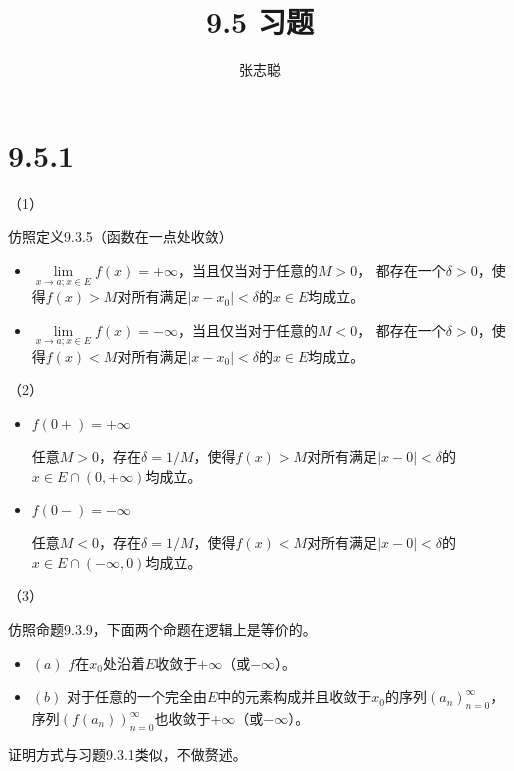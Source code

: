\documentclass{article}
\begin{document}
\title{9.5 习题}
\author{张志聪}
\maketitle

\section*{9.5.1}
（1）

仿照定义9.3.5（函数在一点处收敛）

\begin{itemize}
  \item  $\lim\limits_{x \to a; x \in E}f(x) = +\infty$，当且仅当对于任意的$M > 0$，
        都存在一个$\delta > 0$，使得$f(x) > M$对所有满足$|x - x_0| < \delta$的$x \in E$均成立。

  \item $\lim\limits_{x \to a; x \in E}f(x) = -\infty$，当且仅当对于任意的$M < 0$，
        都存在一个$\delta > 0$，使得$f(x) < M$对所有满足$|x - x_0| < \delta$的$x \in E$均成立。

\end{itemize}

（2）

\begin{itemize}
  \item $f(0+) = +\infty$

        任意$M > 0$，存在$\delta = 1/M$，使得$f(x) > M$对所有满足$|x - 0| < \delta$的$x \in E \cap (0, +\infty)$均成立。

  \item $f(0-) = -\infty$

        任意$M < 0$，存在$\delta = 1/M$，使得$f(x) < M$对所有满足$|x - 0| < \delta$的$x \in E \cap (-\infty, 0)$均成立。
\end{itemize}


（3）

仿照命题9.3.9，下面两个命题在逻辑上是等价的。

\begin{itemize}
  \item $(a)$ $f$在$x_0$处沿着$E$收敛于$+\infty$（或$-\infty$）。
  \item $(b)$ 对于任意的一个完全由$E$中的元素构成并且收敛于$x_0$的序列$(a_n)_{n=0}^\infty$，
        序列$(f(a_n))_{n=0}^\infty$也收敛于$+\infty$（或$-\infty$）。
\end{itemize}

证明方式与习题9.3.1类似，不做赘述。
\end{document}
